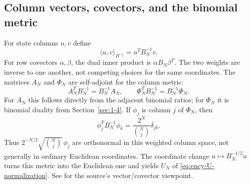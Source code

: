 \subsection{Column vectors, covectors, and the binomial metric}
\label{sec:binomial-dual-metrics}
For state columns $u,v$ define
\[
\langle u,v\rangle_{B^{-1}}=u^TB_N^{-1}v.
\]
For row covectors $\alpha,\beta$, the dual inner product is
$\alpha B_N\beta^T$. The two weights are inverse to one another,
not competing choices for the same coordinates.
The matrices $A_N$ and $\Phi_N$ are self-adjoint for the column metric:
\[
A_N^TB_N^{-1}=B_N^{-1}A_N,\qquad
\Phi_N^TB_N^{-1}=B_N^{-1}\Phi_N.
\]
For $A_N$ this follows directly from the adjacent binomial ratios; for
$\Phi_N$ it is binomial duality from Section~\ref{sec:1-4}.
If $\phi_j$ is column $j$ of $\Phi_N$, then
\[
\phi_j^TB_N^{-1}\phi_k=\frac{2^N}{\binom Nj}\delta_{jk}.
\]
Thus $2^{-N/2}\sqrt{\binom Nj}\,\phi_j$ are orthonormal in this
weighted column space, not generally in ordinary Euclidean coordinates.
The coordinate change $u\mapsto B_N^{-1/2}u$ turns this metric into
the Euclidean one and yields $U_N$ of \eqref{eq:ency-U-normalization}.
See \cite[Appendix~A]{KocikFeynman} for the source's vector/covector viewpoint.
